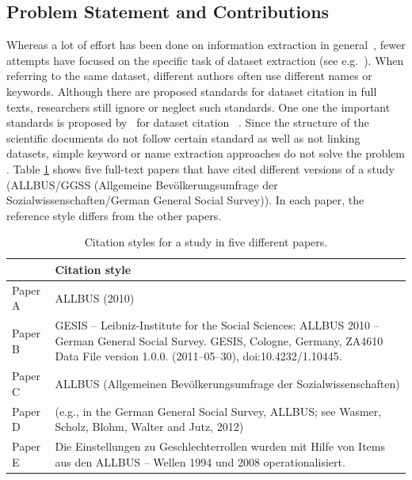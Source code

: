 \documentclass{IOS-Book-Article}
\begin{document}
\subsection{Problem Statement and Contributions}
Whereas a lot of effort has been done on information extraction in general~\citep{Sarawagi2007}, fewer attempts have focused on the specific task of dataset extraction (see e.g.~\citep{MeiyuLu2012}). 
When referring to the same dataset, different authors often use different names or keywords.
Although there are proposed standards for dataset citation in full texts, researchers still ignore or neglect such standards.
One one the important standards is proposed by~\citeauthor{altman2007proposed} for dataset citation
~\citeyearpar{altman2007proposed}.
Since the structure of the scientific documents do not follow certain standard as well as not linking datasets, simple keyword or name extraction approaches do not solve the problem \citep{Nadeau2007}. 
Table \ref{table:citation-variety} shows five full-text papers that have cited different versions of a study (ALLBUS/GGSS (Allgemeine Bev\"olkerungsumfrage der Sozialwissenschaften/German General Social Survey)). In each paper, the reference style differs from the other papers.  

\begin{table}[h!]
	\renewcommand{\arraystretch}{2}
	\centering
	\begin{tabular}{p{2.5cm}p{7cm}}
		\hline
		& Citation style \\
		\hline
		Paper A  & ALLBUS (2010)\\
		
		Paper B  & GESIS -- Leibniz-Institute for the Social Sciences: ALLBUS 2010 -- German General Social Survey. GESIS, Cologne, Germany, ZA4610 Data File version 1.0.0. (2011--05--30), doi:10.4232/1.10445. \\ 
		
		Paper C & ALLBUS (Allgemeinen Bev\"olkerungsumfrage der Sozialwissenschaften)\\
		
		Paper D & (e.g., in the German General Social Survey, ALLBUS; see Wasmer, Scholz, Blohm, Walter and Jutz, 2012)\\
		
		Paper E & Die Einstellungen zu Geschlechterrollen wurden mit Hilfe von Items aus den ALLBUS -- Wellen 1994 und 2008 operationalisiert.\\\hline
	\end{tabular}
	\caption{Citation styles for a study in five different papers.}
	\label{table:citation-variety}
\end{table}
\end{document}
